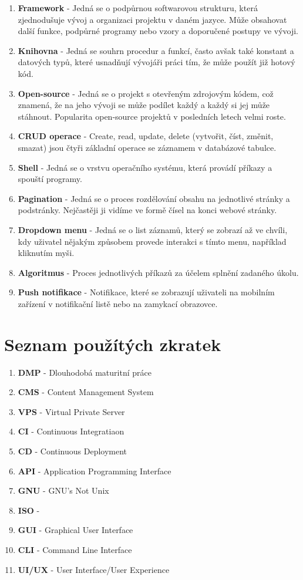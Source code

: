\documentclass[12pt,a4paper]{report}
\begin{document}
\begin{enumerate}
    \item \textbf{Framework} - Jedná se o podpůrnou softwarovou strukturu, která zjednodušuje vývoj a organizaci projektu v daném jazyce. Může obsahovat další funkce, podpůrné programy nebo vzory a doporučené postupy ve vývoji.
    \item \textbf{Knihovna} - Jedná se souhrn procedur a funkcí, často avšak také konstant a datových typů, které usnadňují vývojáři práci tím, že může použít již hotový kód.
    \item \textbf{Open-source} - Jedná se o projekt s otevřeným zdrojovým kódem, což znamená, že na jeho vývoji se může podílet každý a každý si jej může stáhnout. Popularita open-source projektů v posledních letech velmi roste.
    \item \textbf{CRUD operace} - Create, read, update, delete (vytvořit, číst, změnit, smazat) jsou čtyři základní operace se záznamem v databázové tabulce.
    \item \textbf{Shell} - Jedná se o vrstvu operačního systému, která provádí příkazy a spouští programy.
    \item \textbf{Pagination} - Jedná se o proces rozdělování obsahu na jednotlivé stránky a podstránky. Nejčastěji ji vidíme ve formě čísel na konci webové stránky.
    \item \textbf{Dropdown menu} -  Jedná se o list záznamů, který se zobrazí až ve chvíli, kdy uživatel nějakým způsobem provede interakci s tímto menu, například kliknutím myši.
    \item \textbf{Algoritmus} - Proces jednotlivých příkazů za účelem splnění zadaného úkolu.
    \item \textbf{Push notifikace} - Notifikace, které se zobrazují uživateli na mobilním zařízení v notifikační listě nebo na zamykací obrazovce.
  \end{enumerate}
  \section{Seznam použítých zkratek}
  \begin{enumerate}
    \item \textbf{DMP} - Dlouhodobá maturitní práce
    \item \textbf{CMS} - Content Management System
    \item \textbf{VPS} - Virtual Private Server
    \item \textbf{CI} - Continuous Integratiaon
    \item \textbf{CD} - Continuous Deployment
    \item \textbf{API} - Application Programming Interface
    \item \textbf{GNU} - GNU's Not Unix
    \item \textbf{ISO} - 
    \item \textbf{GUI} - Graphical User Interface
    \item \textbf{CLI} - Command Line Interface
    \item \textbf{UI/UX} - User Interface/User Experience
  
  \end{enumerate} 
  
\end{document}

